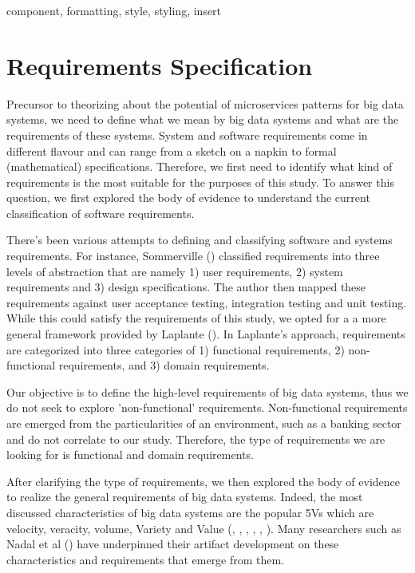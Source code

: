 \documentclass[conference]{IEEEtran}
\begin{document}
\begin{IEEEkeywords}
component, formatting, style, styling, insert
\end{IEEEkeywords}

\section{Requirements Specification}

Precursor to theorizing about the potential of microservices patterns for big data systems, we need to define what we mean by big data systems and what are the requirements of these systems. System and software requirements come in different flavour and can range from a sketch on a napkin to formal (mathematical) specifications. Therefore, we first need to identify what kind of requirements is the most suitable for the purposes of this study. To answer this question, we first explored the body of evidence to understand the current classification of software requirements. 

There's been various attempts to defining and classifying software and systems requirements. For instance, Sommerville (\cite{sommerville2011software}) classified requirements into three levels of abstraction that are namely 1) user requirements, 2) system requirements and 3) design specifications. The author then mapped these requirements against user acceptance testing, integration testing and unit testing. While this could satisfy the requirements of this study, we opted for a a more general framework provided by Laplante (\cite{laplante2017requirements}). In Laplante's approach, requirements are categorized into three categories of 1) functional requirements, 2) non-functional requirements, and 3) domain requirements. 

Our objective is to define the high-level requirements of big data systems, thus we do not seek to explore 'non-functional' requirements. Non-functional requirements are emerged from the particularities of an environment, such as a banking sector and do not correlate to our study. Therefore, the type of requirements we are looking for is functional and domain requirements.

After clarifying the type of requirements, we then explored the body of evidence to realize the general requirements of big data systems. Indeed, the most discussed characteristics of big data systems are the popular 5Vs which are velocity, veracity, volume, Variety and Value (\cite{Demchenko2014}, \cite{Bughin2016}, \cite{Bahrami2015}, \cite{rad2017big}, \cite{Marz2015}, \cite{Chen2016a} ). Many researchers such as Nadal et al (\cite{nadal2017software}) have underpinned their artifact development on these characteristics and requirements that emerge from them. 
\end{document}
